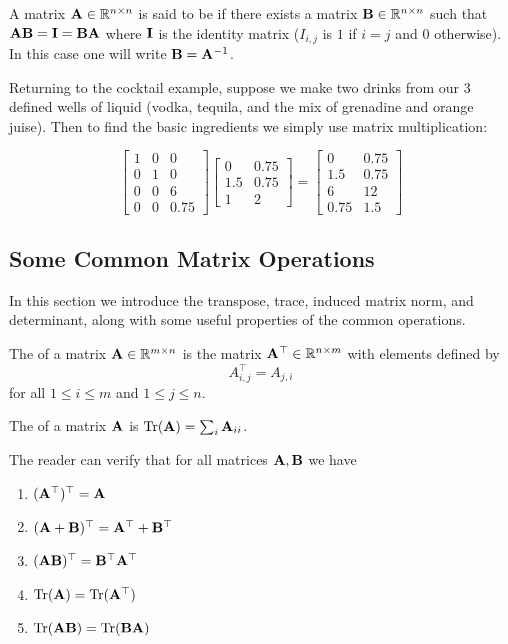 A matrix $\MA\in\R^{n\times n}$ is said to be  if there exists a matrix $\MB\in\R^{n\times n}$ such that $\MA\MB = \MI = \MB\MA$ where $\MI$ is the identity matrix ($I_{i,j}$ is $1$ if $i=j$ and $0$ otherwise). In this case one will write $\MB = \MA^{-1}$.

\begin{example}
Returning to the cocktail example, suppose we make two drinks from our 3 defined wells of liquid (vodka, tequila, and the mix of grenadine and orange juise). Then to find the basic ingredients we simply use matrix multiplication: 

$$ \begin{bmatrix}
1 & 0 & 0 \\
0 & 1 & 0 \\
0 & 0 & 6 \\
0 & 0 & 0.75
\end{bmatrix}\begin{bmatrix}
0 & 0.75 \\
1.5 & 0.75 \\
1 & 2 
\end{bmatrix} = \begin{bmatrix}
0 & 0.75 \\
1.5 & 0.75 \\
6 & 12 \\
0.75 & 1.5
\end{bmatrix}$$
\end{example}

\subsection{Some Common Matrix Operations} 

In this section we introduce the transpose, trace, induced matrix norm, and determinant, along with some useful properties of the common operations.

\begin{definition}\label{trans-def}
The  of a matrix $\MA \in \mathbb R^{m \times n}$ is the matrix $\MA^\top \in \mathbb R^{n\times m}$ with elements defined by 
$$A^\top_{i,j} = A_{j,i}$$ 
for all $1\leq i\leq m$ and $1\leq j\leq n$.
\end{definition}

\begin{definition}
The  of a matrix $\MA$ is $\trace(\MA) = \sum_i \MA_{ii}$.
\end{definition}

The reader can verify that for all matrices $\MA,\MB$ we have
\begin{enumerate}
    \item $(\MA^\top)^\top = \MA$
    \item $(\MA + \MB)^\top = \MA^\top + \MB^\top$
    \item $(\MA\MB)^\top = \MB^\top \MA^\top$
    \item $\trace(\MA) = \trace(\MA^\top)$
    \item $\trace(\MA\MB) = \trace(\MB\MA)$
\end{enumerate}

